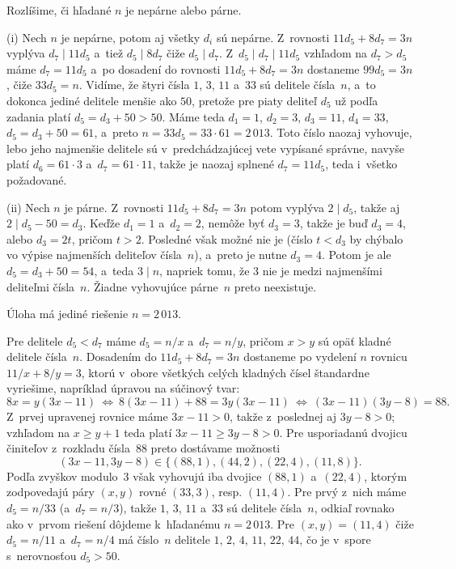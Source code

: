 {%
Rozlíšime, či hľadané $n$ je nepárne alebo párne.

(i) Nech $n$ je nepárne, potom aj všetky $d_i$ sú nepárne.
Z~rovnosti $11d_5+8d_7=3n$ vyplýva $d_7\mid11d_5$ a~tiež
$d_5\mid8d_7$ čiže $d_5\mid d_7$. Z~$d_5\mid d_7\mid11d_5$
vzhľadom na $d_7>d_5$ máme $d_7=11d_5$ a~po dosadení do rovnosti
$11d_5+8d_7=3n$ dostaneme $99d_5=3n$, čiže $33d_5=n$. Vidíme, že
štyri čísla $1$, $3$, $11$ a~$33$ sú delitele čísla~$n$,
a~to dokonca jediné delitele menšie ako $50$, pretože pre piaty deliteľ
$d_5$ už podľa zadania platí $d_5=d_3+50>50$. Máme teda $d_1=1$,
$d_2=3$, $d_3=11$, $d_4=33$, $d_5=d_3+50=61$, a~preto
$n=33d_5={33\cdot61}=2\,013$. Toto číslo naozaj vyhovuje, lebo
jeho najmenšie delitele sú v~predchádzajúcej vete vypísané správne, navyše
platí $d_6=61\cdot3$ a~$d_7=61\cdot11$, takže je naozaj
splnené $d_7=11d_5$, teda i~všetko požadované.

(ii) Nech $n$ je párne. Z~rovnosti $11d_5+8d_7=3n$ potom vyplýva
$2\mid d_5$, takže aj $2\mid d_5-50=d_3$. Keďže $d_1=1$
a~$d_2=2$, nemôže byť $d_3=3$, takže je buď $d_3=4$, alebo $d_3=2t$,
pričom $t>2$. Posledné však možné nie je (číslo $t<d_3$ by chýbalo vo
výpise najmenších deliteľov čísla~$n$), a~preto je nutne $d_3=4$.
Potom je ale $d_5=d_3+50=54$, a~teda $3\mid n$, napriek tomu, že $3$ nie je
medzi najmenšími deliteľmi čísla~$n$. Žiadne vyhovujúce párne~$n$ preto
neexistuje.

\odpoved
Úloha má jediné riešenie $n=2\,013$.

\ineriesenie
Pre delitele $d_5<d_7$ máme $d_5=n/x$ a~$d_7=n/y$, pričom $x>y$
sú opäť kladné delitele čísla~$n$. Dosadením do $11d_5+8d_7=3n$
dostaneme po vydelení $n$ rovnicu $11/x+8/y=3$, ktorú v~obore
všetkých celých kladných čísel štandardne vyriešime,
napríklad úpravou na súčinový tvar:
$$
8x=y(3x-11)\ \Leftrightarrow\ 8(3x-11)+88=3y(3x-11)\ \Leftrightarrow\ (3x-11)(3y-8)=88.
$$
Z~prvej upravenej rovnice máme $3x-11>0$, takže z~poslednej aj
$3y-8>0$; vzhľadom na $x\ge y+1$ teda platí $3x-11\ge
3y-8>0$. Pre usporiadanú dvojicu činiteľov
z~rozkladu čísla~$88$ preto dostávame možnosti
$$
(3x-11,3y-8)\in\{(88, 1),(44, 2),(22, 4),(11, 8)\}.
$$
Podľa zvyškov modulo~$3$ však vyhovujú iba dvojice $(88, 1)$
a~$(22, 4)$, ktorým zodpovedajú páry $(x,y)$ rovné $(33, 3)$, resp.
$(11, 4)$. Pre prvý z~nich máme $d_5=n/33$ (a~$d_7=n/3$),
takže $1$, $3$, $11$ a~$33$ sú delitele čísla~$n$, odkiaľ rovnako ako
v~prvom riešení dôjdeme k~hľadanému $n=2\,013$. Pre $(x,y)=(11, 4)$
čiže $d_5=n/11$
a~$d_7=n/4$ má číslo~$n$ delitele $1$, $2$, $4$, $11$, $22$, $44$, čo je v~spore s~nerovnosťou $d_5>50$.
}

